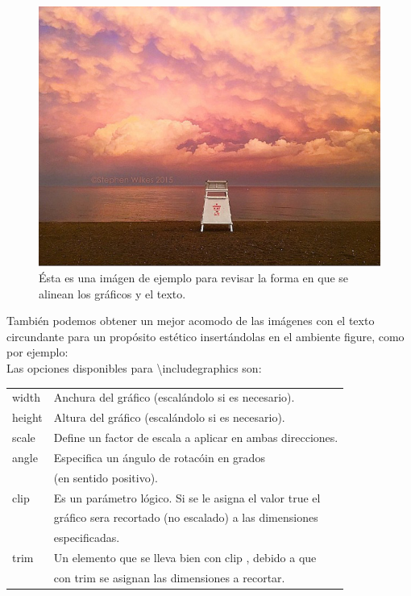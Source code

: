 \documentclass{article}
\begin{document}
\begin{figure}[h]
\includegraphics[scale=.16]{lago}
\centering
\caption{\'Esta es una im\'agen de ejemplo para revisar la forma en que se alinean los gr\'aficos y el texto.}
\end{figure}


Tambi\'en podemos obtener un mejor acomodo de las im\'agenes con el texto circundante para un prop\'osito est\'etico insert\'andolas en el ambiente figure, como por ejemplo: \\
\newpage
Las opciones disponibles para \textbackslash includegraphics son:

\begin{tabular}{l l}
\hline 
\hline 
width & Anchura del gr\'afico (escal\'andolo si es necesario).\\ 
height & Altura del gr\'afico (escal\'andolo si es necesario).\\ 
scale & Define un factor de escala a aplicar en ambas direcciones.\\
angle & Especifica un \'angulo de rotac\'oin en grados\\ 
&(en sentido positivo).\\ 
clip & Es un par\'ametro l\'ogico. Si se le asigna el valor true el\\ 
&gr\'afico sera recortado (no escalado) a las dimensiones\\ 
&especificadas.\\ 
trim & Un elemento que se lleva bien con clip , debido a que\\ 
& con trim se asignan las dimensiones a recortar.  \\
\hline
\hline
\end{tabular}
\medskip
\end{document}
